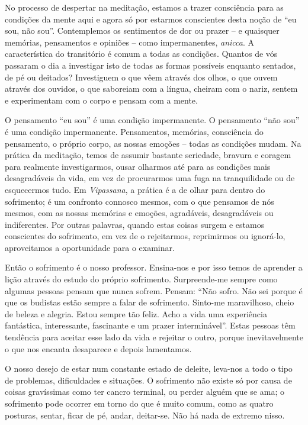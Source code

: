 No processo de despertar na meditação, estamos a trazer consciência para as
condições da mente aqui e agora só por estarmos conscientes desta noção de ``eu
sou, não sou''. Contemplemos os sentimentos de dor ou prazer -- e quaisquer
memórias, pensamentos e opiniões -- como impermanentes, \emph{anicca}. A
característica do transitório é comum a todas as condições. Quantos de vós
passaram o dia a investigar isto de todas as formas possíveis enquanto sentados,
de pé ou deitados? Investiguem o que vêem através dos olhos, o que ouvem através
dos ouvidos, o que saboreiam com a língua, cheiram com o nariz, sentem e
experimentam com o corpo e pensam com a mente.

O pensamento ``eu sou'' é uma condição impermanente. O pensamento ``não sou'' é
uma condição impermanente. Pensamentos, memórias, consciência do pensamento, o
próprio corpo, as nossas emoções -- todas as condições mudam. Na prática da
meditação, temos de assumir bastante seriedade, bravura e coragem para realmente
investigarmos, ousar olharmos até para as condições mais desagradáveis da vida,
em vez de procurarmos uma fuga na tranquilidade ou de esquecermos tudo. Em
\emph{Vipassana}, a prática é a de olhar para dentro do sofrimento; é um
confronto connosco mesmos, com o que pensamos de nós mesmos, com as nossas
memórias e emoções, agradáveis, desagradáveis ou indiferentes. Por outras
palavras, quando estas coisas surgem e estamos conscientes do sofrimento, em vez
de o rejeitarmos, reprimirmos ou ignorá-lo, aproveitamos a oportunidade para o
examinar.

Então o sofrimento é o nosso professor. Ensina-nos e por isso temos de aprender
a lição através do estudo do próprio sofrimento. Surpreende-me sempre como
algumas pessoas pensam que nunca sofrem. Pensam: ``Não sofro. Não sei porque é
que os budistas estão sempre a falar de sofrimento. Sinto-me maravilhoso, cheio
de beleza e alegria. Estou sempre tão feliz. Acho a vida uma experiência
fantástica, interessante, fascinante e um prazer interminável''. Estas pessoas
têm tendência para aceitar esse lado da vida e rejeitar o outro, porque
inevitavelmente o que nos encanta desaparece e depois lamentamos.

O nosso desejo de estar num constante estado de deleite, leva-nos a todo o tipo
de problemas, dificuldades e situações. O sofrimento não existe só por causa de
coisas gravíssimas como ter cancro terminal, ou perder alguém que se ama; o
sofrimento pode ocorrer em torno do que é muito comum, como as quatro posturas,
sentar, ficar de pé, andar, deitar-se. Não há nada de extremo nisso.

